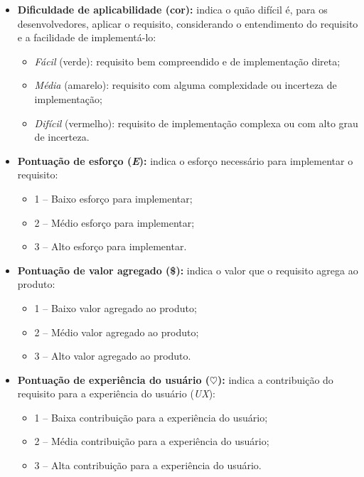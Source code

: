 \begin{itemize}
    \item \textbf{Dificuldade de aplicabilidade (cor):} indica o quão difícil é, para os desenvolvedores, aplicar o requisito, considerando o entendimento do requisito e a facilidade de implementá-lo:
    \begin{itemize}
        \item \textit{Fácil} (verde): requisito bem compreendido e de implementação direta;
        \item \textit{Média} (amarelo): requisito com alguma complexidade ou incerteza de implementação;
        \item \textit{Difícil} (vermelho): requisito de implementação complexa ou com alto grau de incerteza.
    \end{itemize}
    \item \textbf{Pontuação de esforço (\textit{E}):} indica o esforço necessário para implementar o requisito:
    \begin{itemize}
        \item 1 -- Baixo esforço para implementar;
        \item 2 -- Médio esforço para implementar;
        \item 3 -- Alto esforço para implementar.
    \end{itemize}
    \item \textbf{Pontuação de valor agregado (\$):} indica o valor que o requisito agrega ao produto:
    \begin{itemize}
        \item 1 -- Baixo valor agregado ao produto;
        \item 2 -- Médio valor agregado ao produto;
        \item 3 -- Alto valor agregado ao produto.
    \end{itemize}
    \item \textbf{Pontuação de experiência do usuário ($\heartsuit$):} indica a contribuição do requisito para a experiência do usuário (\textit{UX}):
    \begin{itemize}
        \item 1 -- Baixa contribuição para a experiência do usuário;
        \item 2 -- Média contribuição para a experiência do usuário;
        \item 3 -- Alta contribuição para a experiência do usuário.
    \end{itemize}
\end{itemize}

